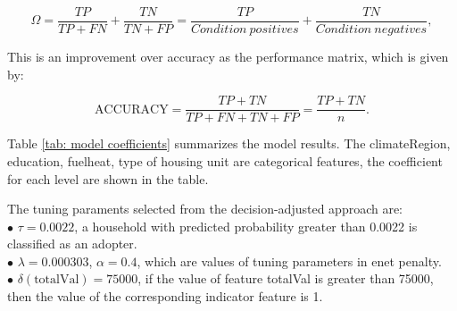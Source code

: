 
\begin{equation*}
            \Omega=\frac{TP}{TP+FN}+\frac{TN}{TN+FP}=\frac{TP}{Condition\ positives}+\frac{TN}{Condition\ negatives},
        \end{equation*}

This is an improvement over accuracy as the performance matrix, which
is given by:

\begin{equation*}
        \text{ACCURACY}=\frac{TP+TN}{TP+FN+TN+FP}=\frac{TP+TN}{n}.
        \end{equation*}


Table \ref{tab: model coefficients} summarizes the model results. The climateRegion, education, fuelheat, type of housing unit are categorical features, the coefficient for each level are shown in the table.

The tuning paraments selected from the decision-adjusted approach are: \\
$\bullet$ $\tau = 0.0022$, a household with predicted probability greater than 0.0022 is classified as an adopter.\\
$\bullet$ $\lambda = 0.000303$, $\alpha = 0.4$, which are values of tuning parameters in enet penalty.\\
$\bullet$ $\delta(\text{totalVal}) = 75000$, if the value of feature totalVal is greater than 75000, then the value of the corresponding indicator feature is 1.\\

